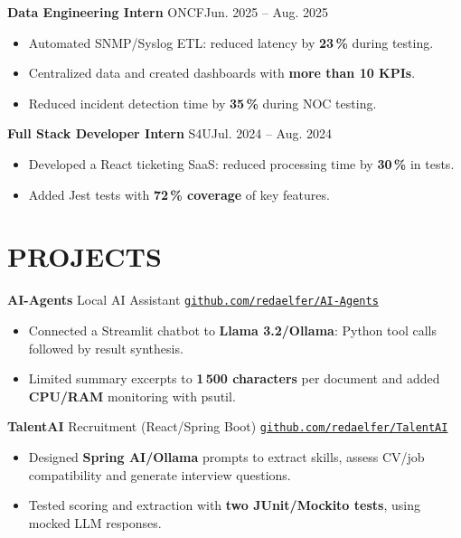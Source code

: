 \documentclass[11pt,a4paper]{article}
\newcommand{\entry}[2]{\noindent #1\hfill #2\par}
\newcommand{\jobgap}{\vspace{5pt}}
\begin{document}
\jobgap
\entry{\textbf{Data Engineering Intern} \textbar{} ONCF}{Jun. 2025 -- Aug. 2025}
\begin{itemize}
  \item Automated SNMP/Syslog ETL: reduced latency by \textbf{23\,\%} during testing.
  \item Centralized data and created dashboards with \textbf{more than 10 KPIs}.
  \item Reduced incident detection time by \textbf{35\,\%} during NOC testing.
\end{itemize}

\jobgap
\entry{\textbf{Full Stack Developer Intern} \textbar{} S4U}{Jul. 2024 -- Aug. 2024}
\begin{itemize}
  \item Developed a React ticketing SaaS: reduced processing time by \textbf{30\,\%} in tests.
  \item Added Jest tests with \textbf{72\,\% coverage} of key features.
\end{itemize}

\section*{PROJECTS}

\textbf{AI-Agents} \textbar{} Local AI Assistant \textbar{} \href{https://github.com/redaelfer/AI-Agents}{\nolinkurl{github.com/redaelfer/AI-Agents}}\par
\begin{itemize}
  \item Connected a Streamlit chatbot to \textbf{Llama 3.2/Ollama}: Python tool calls followed by result synthesis.
  \item Limited summary excerpts to \textbf{1\,500 characters} per document and added \textbf{CPU/RAM} monitoring with psutil.
\end{itemize}

\jobgap
\textbf{TalentAI} \textbar{} Recruitment (React/Spring Boot) \textbar{} \href{https://github.com/redaelfer/TalentAI}{\nolinkurl{github.com/redaelfer/TalentAI}}\par
\begin{itemize}
  \item Designed \textbf{Spring AI/Ollama} prompts to extract skills, assess CV/job compatibility and generate interview questions.
  \item Tested scoring and extraction with \textbf{two JUnit/Mockito tests}, using mocked LLM responses.
\end{itemize}
\end{document}
